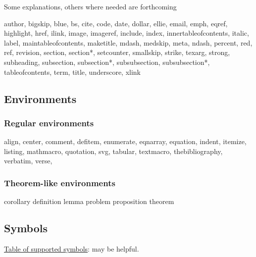 Some explanations, others where needed are forthcoming

\begin{indent}
author,
bigskip,
blue,
bs,
cite,
code,
date,
dollar,
ellie,
email,
emph,
eqref,
highlight,
href,
ilink,
image,
imageref,
include,
index,
innertableofcontents,
italic,
label,
maintableofcontents,
maketitle,
mdash,
medskip,
meta,
ndash,
percent,
red,
ref,
revision,
section,
section*,
setcounter,
smallskip,
strike,
texarg,
strong,
subheading,
subsection,
subsection*,
subsubsection,
subsubsection*,
tableofcontents,
term,
title,
underscore,
xlink
\end{indent}

\subsection{Environments}

\subsubsection{Regular environments}

\begin{indent}
align,
center,
comment,
defitem,
enumerate,
eqnarray,
equation,
indent,
itemize,
listing,
mathmacro,
quotation,
svg,
tabular,
textmacro,
thebibliography,
verbatim,
verse,
\end{indent}

\subsubsection{Theorem-like environments}

\begin{indent}
corollary
definition
lemma
problem
proposition
theorem
\end{indent}



\subsection{Symbols}

\href{https://katex.org/docs/support_table.html}{Table of supported symbols}: may be helpful.

